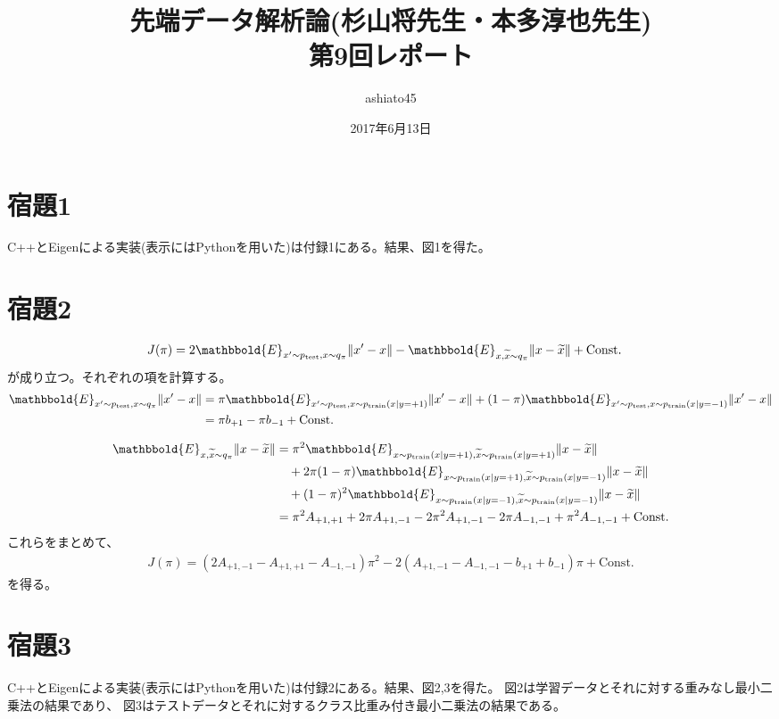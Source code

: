 \documentclass[9pt]{ltjsarticle}
\title{先端データ解析論(杉山将先生・本多淳也先生)\\第9回レポート}
\author{ashiato45}
\date{2017年6月13日}
\newcommand{\bbold}{\mathbbold}
\newcommand{\test}{\mathrm{test}}
\newcommand{\train}{\mathrm{train}}
\newcommand{\kitai}{\bbold{E}}
\begin{document}
\maketitle

\section*{宿題1}
C++とEigenによる実装(表示にはPythonを用いた)は付録1にある。結果、図1を得た。


\section*{宿題2}
\begin{align}
J(\pi)
&=
2\kitai_{x'\sim p_\test, x\sim q_\pi} \norm{x'-x} - \kitai_{x,\tilde x\sim q_\pi}\norm{x-\tilde x} + \text{Const.}
\end{align}
が成り立つ。それぞれの項を計算する。
\begin{align}
\kitai_{x'\sim p_\test, x\sim q_\pi} \norm{x'-x}
&=
\pi \kitai_{x'\sim p_\test, x\sim p_\train(x\mid y=+1)} \norm{x'-x} + (1-\pi)\kitai_{x'\sim p_\test, x\sim p_\train(x\mid y=-1)}\norm{x'-x}\\
&=
\pi b_{+1} - \pi b_{-1} + \text{Const.}
\end{align}

\begin{align}
\kitai_{x,\tilde x\sim q_\pi}\norm{x-\tilde x}
&=
\pi^2\kitai_{x\sim p_\train(x\mid y=+1),\tilde x\sim p_\train(x\mid y=+1)}\norm{x-\tilde x}\\
&\quad+ 2\pi(1-\pi)\kitai_{x\sim p_\train(x\mid y=+1),\tilde x\sim p_\train(x\mid y=-1)}\norm{x-\tilde x}\\
&\quad+ (1-\pi)^2\kitai_{x\sim p_\train(x\mid y=-1),\tilde x\sim p_\train(x\mid y=-1)}\norm{x-\tilde x}\\
&= \pi^2 A_{+1,+1} + 2\pi A_{+1,-1} -2\pi^2 A_{+1,-1} -2\pi A_{-1,-1} +\pi^2 A_{-1,-1} + \text{Const.}
\end{align}
これらをまとめて、
\begin{align}
J(\pi) = (2A_{+1,-1} - A_{+1,+1} - A_{-1,-1})\pi^2
-2(A_{+1,-1} - A_{-1,-1}- b_{+1}+ b_{-1})\pi + \text{Const.}
\end{align}
を得る。

\section*{宿題3}
C++とEigenによる実装(表示にはPythonを用いた)は付録2にある。結果、図2,3を得た。
図2は学習データとそれに対する重みなし最小二乗法の結果であり、
図3はテストデータとそれに対するクラス比重み付き最小二乗法の結果である。
\end{document}
